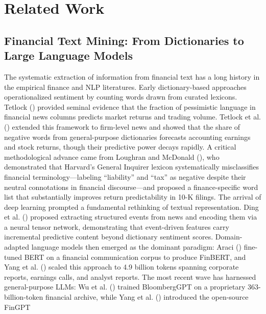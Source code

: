 \documentclass[
  11pt,
  a4paper,
]{article}
\begin{document}
\section{Related Work}\label{related-work}

\subsection{Financial Text Mining: From Dictionaries to Large Language
Models}\label{financial-text-mining-from-dictionaries-to-large-language-models}

The systematic extraction of information from financial text has a long
history in the empirical finance and NLP literatures. Early
dictionary-based approaches operationalized sentiment by counting words
drawn from curated lexicons. Tetlock ()
provided seminal evidence that the fraction of pessimistic language in
financial news columns predicts market returns and trading volume.
Tetlock et al. () extended this
framework to firm-level news and showed that the share of negative words
from general-purpose dictionaries forecasts accounting earnings and
stock returns, though their predictive power decays rapidly. A critical
methodological advance came from Loughran and McDonald
(), who demonstrated that
Harvard's General Inquirer lexicon systematically misclassifies
financial terminology---labeling ``liability'' and ``tax'' as negative
despite their neutral connotations in financial discourse---and proposed
a finance-specific word list that substantially improves return
predictability in 10-K filings. The arrival of deep learning prompted a
fundamental rethinking of textual representation. Ding et al.
() proposed extracting structured events
from news and encoding them via a neural tensor network, demonstrating
that event-driven features carry incremental predictive content beyond
dictionary sentiment scores. Domain-adapted language models then emerged
as the dominant paradigm: Araci ()
fine-tuned BERT on a financial communication corpus to produce FinBERT,
and Yang et al. () scaled this approach to
4.9 billion tokens spanning corporate reports, earnings calls, and
analyst reports. The most recent wave has harnessed general-purpose
LLMs: Wu et al. () trained BloombergGPT on a
proprietary 363-billion-token financial archive, while Yang et al.
() introduced the open-source FinGPT
\end{document}
